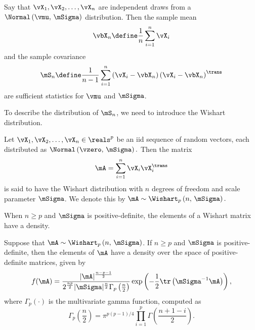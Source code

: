 \begin{proposition}\label{P:normal-sufficient-stats}
Say that
\(
    \vX_1, \vX_2, \ldots, \vX_n
\) 
are independent draws from a
\(
    \Normal \left(
        \vmu, \,
        \mSigma
    \right)
\)
distribution.  Then the sample mean
\begin{equation}\label{E:sample-mean}
    \vbX_n
    \define
    \frac{1}{n}
    \sum_{i=1}^n
        \vX_i
\end{equation}
and the sample covariance
\begin{equation}\label{E:sample-covariance}
    \mS_n
    \define
    \frac{1}{n-1}
    \sum_{i=1}^n
        \left(
            \vX_i - \vbX_n
        \right)
        \left(
            \vX_i - \vbX_n
        \right)^\trans
\end{equation}
are sufficient statistics for $\vmu$ and $\mSigma$.
\end{proposition}

To describe the distribution of $\mS_n$, we need to introduce the 
Wishart distribution.

\begin{definition}\label{D:wishart}
Let $\vX_1, \vX_2, \ldots, \vX_n \in \reals^p$ be an iid sequence of
random vectors, each distributed as
\(
    \Normal \left(
        \vzero, \,
        \mSigma
    \right).
\)
Then the matrix
\[
    \mA = \sum_{i=1}^n \vX_i \vX_i^\trans
\]
is said to have the Wishart distribution with $n$ degrees of freedom and scale parameter $\mSigma$.  We denote this by
\(
    \mA
    \sim
    \Wishart_p \left(
        n, \,
        \mSigma
    \right).
\)
\end{definition}

\noindent
When $n \geq p$ and $\mSigma$ is positive-definite, the elements of a Wishart matrix have a density.
\begin{proposition}
Suppose that
\(
    \mA
    \sim
    \Wishart_p \left(
        n, \,
        \mSigma
    \right)
\).
If $n \geq p$ and $\mSigma$ is positive-definite, then the elements of $\mA$ have a density over the space of positive-definite matrices, given by
\begin{equation}\label{E:wishart-density}
    f( \mA )
    =
    \frac{ |\mA|^\frac{n-p-1}{2} }
         { 2^\frac{np}{2} 
           |\mSigma|^\frac{n}{2} 
           \Gamma_p \left( \frac{n}{2} \right) }
    \exp \left(
        -
        \frac{1}{2}
        \tr \left(
            \mSigma^{-1} \mA
        \right)
    \right),
\end{equation}
where
\(
    \Gamma_p \left( \cdot \right)
\)
is the multivariate gamma function, computed as
\begin{equation}
    \Gamma_p \left( \frac{n}{2} \right)
    =
    \pi^{p(p-1)/4}
    \prod_{i=1}^p
        \Gamma \left(
            \frac{n + 1 - i}{2}
        \right).
\end{equation}
\end{proposition}

